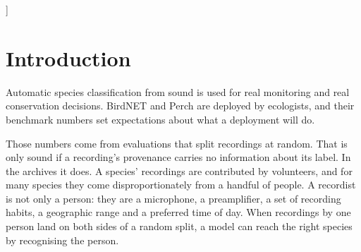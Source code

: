\documentclass[10pt,twocolumn,a4paper]{article}
\begin{document}
\begin{@twocolumnfalse}
\begin{abstract}
the same recordings, the points climb from 12.75 to 18.51 while the error ratio falls from 2.97 to
2.01. Neither unit is invariant, so a figure quoted without its label-set size cannot be compared
against.
%
Two further measurements say what to do about it. The cost falls monotonically with how many
recordists a species has --- \textbf{30.8 points at two recordists against 3.1 at six or more},
with recordings per species and label-set size both held flat --- which turns ``more recordists
per species'' from a slogan into a target. And the \emph{same individual recordists} are the
findable ones in both models: per-recordist findability correlates at \textbf{+0.85} between
Perch and BirdNET after removing the effect of how many recordings each contributed, against a
shuffled null of +0.14.
%
Separately, and on identical rows, the two foundation models disagree about the size of the
recordist confound by more than either differs from a 32-dimensional space trained on one
small corpus: Perch sits 16.5\,\% below that space and BirdNET 24\,\% above it. If recorder
invariance were a product of archive-scale training, both would sit below. It is better read
as a property of the archives that any model trained on them inherits.
%
The deliverable is not a system. It is a number, a threat model and the code: block your
splits by recordist, here is what it costs, here is how to reproduce it.
\end{abstract}
\vspace{4mm}
\end{@twocolumnfalse}]
\makeatother

\section{Introduction}
\label{sec:intro}

Automatic species classification from sound is used for real monitoring and real
conservation decisions. BirdNET \citep{birdnet2021} and Perch \citep{perch2} are deployed by
ecologists, and their benchmark numbers set expectations about what a deployment will do.

Those numbers come from evaluations that split recordings at random. That is only sound if a
recording's provenance carries no information about its label. In the archives it does. A
species' recordings are contributed by volunteers, and for many species they come
disproportionately from a handful of people. A recordist is not only a person: they are a
microphone, a preamplifier, a set of recording habits, a geographic range and a preferred
time of day. When recordings by one person land on both sides of a random split, a model can
reach the right species by recognising the person.
\end{document}
